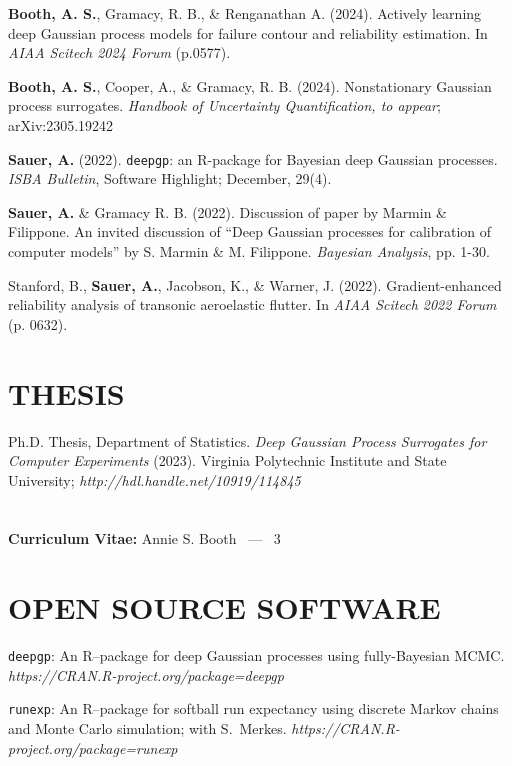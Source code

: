 \documentclass[margin,line,11pt]{res}
\begin{document}
\begin{resume}
{\bf Booth, A. S.}, Gramacy, R. B., \& Renganathan A. (2024). Actively learning deep Gaussian
process models for failure contour and reliability estimation.  In {\it AIAA Scitech 2024 Forum} (p.0577).

{\bf Booth, A. S.}, Cooper, A., \& Gramacy, R. B. (2024). Nonstationary
Gaussian process surrogates. {\it Handbook of Uncertainty Quantification, to appear}; arXiv:2305.19242

{\bf Sauer, A.} (2022). {\tt deepgp}: an {\sf R}-package for Bayesian deep Gaussian 
processes.  {\it ISBA Bulletin}, Software Highlight; December, 29(4).

{\bf Sauer, A.} \& Gramacy R. B. (2022). Discussion of paper by Marmin \& Filippone.  An
invited discussion of ``Deep Gaussian processes for calibration of computer models''
by S. Marmin \& M. Filippone. {\it Bayesian Analysis}, pp. 1-30.

Stanford, B., {\bf Sauer, A.}, Jacobson, K., \& Warner, J. (2022). 
Gradient-enhanced reliability analysis of transonic aeroelastic 
flutter. In {\it AIAA Scitech 2022 Forum} (p. 0632).

\medskip
\section{\bf THESIS}

Ph.D. Thesis, Department of Statistics.  {\it Deep Gaussian Process
Surrogates for Computer Experiments} (2023). Virginia Polytechnic Institute
and State University; {\it http://hdl.handle.net/10919/114845}

\pagebreak
\section{}
\hfill {\bf Curriculum Vitae:} Annie S. Booth \  --- \  3
\medskip

\section{\bf OPEN SOURCE SOFTWARE}

{\tt deepgp}: An {\sf R}--package for deep Gaussian processes 
using fully-Bayesian MCMC.\\
{\sl https://CRAN.R-project.org/package=deepgp}

{\tt runexp}: An {\sf R}--package for softball run expectancy using 
discrete Markov chains and Monte Carlo simulation; with S.~Merkes.
{\sl https://CRAN.R-project.org/package=runexp}




\end{resume}
\end{document}
